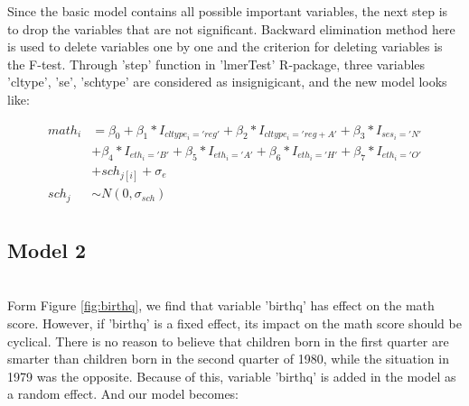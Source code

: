 \documentclass{article}
\begin{document}
Since the basic model contains all possible important variables, the next step is to drop the variables that are not significant. 
Backward elimination method here is used to delete variables one by one and the criterion for deleting variables is the F-test. 
Through 'step' function in 'lmerTest' R-package, three variables 'cltype', 'se', 'schtype' are considered as insignigicant, 
and the new model looks like:

\begin{align*}
    math_i &= \beta_0 + \beta_1*I_{cltype_i='reg'} + \beta_2*I_{cltype_i='reg+A'} + \beta_3*I_{ses_i='N'} \\
    &+ \beta_4*I_{eth_i='B'} + \beta_5*I_{eth_i='A'} + \beta_6*I_{eth_i='H'} + \beta_7*I_{eth_i='O'} \\
    &+ sch_{j[i]} + \sigma_e\\
    sch_j &\sim N(0, \sigma_{sch})\\
\end{align*}

\subsection{Model 2}



\begin{minipage}{\linewidth}
    \label{fig:birthq}
\end{minipage}\\

Form Figure \ref{fig:birthq}, we find that variable 'birthq' has effect on the math score. 
However, if 'birthq' is a fixed effect, its impact on the math score should be cyclical. 
There is no reason to believe that children born in the first quarter are smarter than children born in the second quarter of 1980, 
while the situation in 1979 was the opposite. 
Because of this, variable 'birthq' is added in the model as a random effect. And our model becomes:
\end{document}
